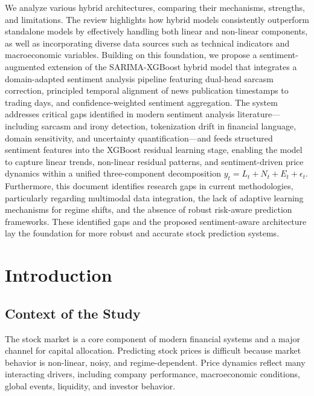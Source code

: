 \documentclass[12pt,a4paper]{article}
\begin{document}
\vspace{0.5cm}
\noindent We analyze various hybrid architectures, comparing their mechanisms, strengths, and limitations. The review highlights how hybrid models consistently outperform standalone models by effectively handling both linear and non-linear components, as well as incorporating diverse data sources such as technical indicators and macroeconomic variables. Building on this foundation, we propose a sentiment-augmented extension of the SARIMA-XGBoost hybrid model that integrates a domain-adapted sentiment analysis pipeline featuring dual-head sarcasm correction, principled temporal alignment of news publication timestamps to trading days, and confidence-weighted sentiment aggregation. The system addresses critical gaps identified in modern sentiment analysis literature---including sarcasm and irony detection, tokenization drift in financial language, domain sensitivity, and uncertainty quantification---and feeds structured sentiment features into the XGBoost residual learning stage, enabling the model to capture linear trends, non-linear residual patterns, and sentiment-driven price dynamics within a unified three-component decomposition $y_t = L_t + N_t + E_t + \epsilon_t$. Furthermore, this document identifies research gaps in current methodologies, particularly regarding multimodal data integration, the lack of adaptive learning mechanisms for regime shifts, and the absence of robust risk-aware prediction frameworks. These identified gaps and the proposed sentiment-aware architecture lay the foundation for more robust and accurate stock prediction systems.

\newpage

\newpage
{}
\setcounter{page}{1}

\section{Introduction}

\subsection{Context of the Study}
The stock market is a core component of modern financial systems and a major channel for capital allocation. Predicting stock prices is difficult because market behavior is non-linear, noisy, and regime-dependent. Price dynamics reflect many interacting drivers, including company performance, macroeconomic conditions, global events, liquidity, and investor behavior.
\end{document}
